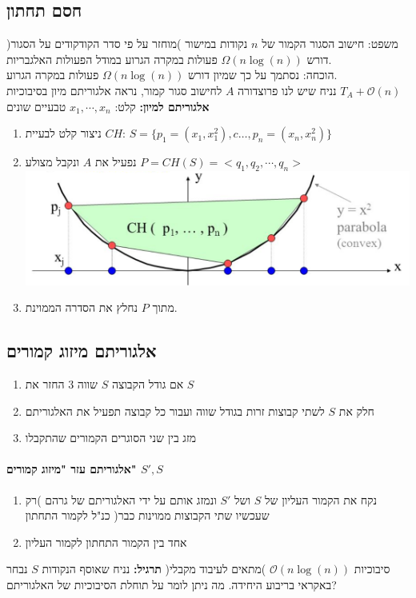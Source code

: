 \documentclass{article}
\makeatletter
\newcommand*{\saved@uline}{}
\let\saved@uline\uline
\newcommand*{\mathuline}{%
  \mathpalette{\math@uline\saved@uline}%
}
\newcommand*{\math@uline}[3]{%
  \mbox{#1{$#2#3\m@th$}}%
}
\renewcommand*{\uline}{%
  \relax  
  \ifmmode
    \expandafter\mathuline
  \else
    \expandafter\saved@uline
  \fi
}
\makeatother
\begin{document}
\subsection{חסם תחתון}
\noindent\uline{משפט:} חישוב הסגור הקמור של $n$ נקודות במישור )מוחזר על פי סדר הקודקודים על הסגור( דורש $\Omega(n \log(n))$ פעולות במקרה הגרוע במודל הפעולות האלגבריות.\\
\uline{הוכחה:} נסתמך על כך שמיון דורש $\Omega(n \log(n))$ פעולות במקרה הגרוע.\\
נניח שיש לנו פרוצדורה $A$ לחישוב סגור קמור, נראה אלגוריתם מיון בסיבוכיות $T_A+\mathcal{O}(n)$\\
\textbf{אלגוריתם למיון:}
\uline{קלט:} $x_1, \cdots, x_n$ טבעיים שונים\\
\begin{enumerate}
\item ניצור קלט לבעיית $CH$: $S=\{ p_1=(x_1, x_1^2), c\dots, p_n=(x_n, x_n^2) \}$
\item נפעיל את $A$ ונקבל מצולע $P=CH(S)= <q_1, q_2, \cdots, q_n>$\\
\includegraphics[scale=0.2]{z4.png}
\\
\item מתוך $P$ נחלץ את הסדרה הממוינת.
\end{enumerate}

\subsection{אלגוריתם מיזוג קמורים}
\begin{enumerate}
\item אם גודל הקבוצה $S$ שווה 3 החזר את $S$
\item חלק את $S$ לשתי קבוצות זרות בגודל שווה ועבור כל קבוצה תפעיל את האלגוריתם
\item מזג בין שני הסוגרים הקמורים שהתקבלו
\end{enumerate}

\paragraph{אלגוריתם עזר "מיזוג קמורים"  $S',S$}
\begin{enumerate}
\item נקח את הקמור העליון של $S$ ושל $S'$ ונמזג אותם על ידי האלגוריתם של גרהם )רק שעכשיו שתי הקבוצות ממוינות כבר( כנ"ל לקמור התחתון
\item אחד בין הקמור התחתון לקמור העליון
\end{enumerate}
\noindent\uline{סיבוכיות} $\mathcal{O}(n\log(n))$ )מתאים לעיבוד מקבלי(
\noindent\textbf{תרגיל:} נניח שאוסף הנקודות $S$ נבחר באקראי בריבוע היחידה. מה ניתן לומר על תוחלת הסיבוכיות של האלגוריתם?
\end{document}

